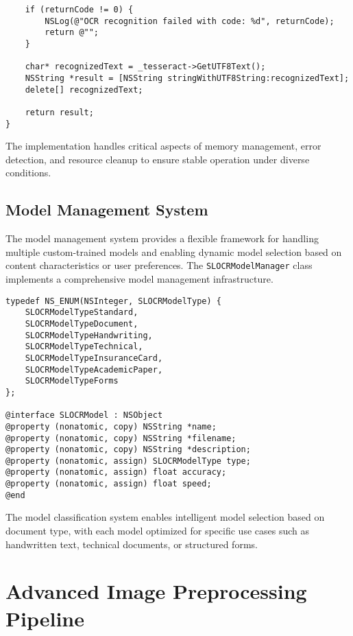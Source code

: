 \begin{table}[H]
\begin{verbatim}
    if (returnCode != 0) {
        NSLog(@"OCR recognition failed with code: %d", returnCode);
        return @"";
    }
    
    char* recognizedText = _tesseract->GetUTF8Text();
    NSString *result = [NSString stringWithUTF8String:recognizedText];
    delete[] recognizedText;
    
    return result;
}
\end{verbatim}

The implementation handles critical aspects of memory management, error detection, and resource cleanup to ensure stable operation under diverse conditions.

\subsection{Model Management System}

The model management system provides a flexible framework for handling multiple custom-trained models and enabling dynamic model selection based on content characteristics or user preferences. The \texttt{SLOCRModelManager} class implements a comprehensive model management infrastructure.

\begin{verbatim}
typedef NS_ENUM(NSInteger, SLOCRModelType) {
    SLOCRModelTypeStandard,
    SLOCRModelTypeDocument,
    SLOCRModelTypeHandwriting,
    SLOCRModelTypeTechnical,
    SLOCRModelTypeInsuranceCard,
    SLOCRModelTypeAcademicPaper,
    SLOCRModelTypeForms
};

@interface SLOCRModel : NSObject
@property (nonatomic, copy) NSString *name;
@property (nonatomic, copy) NSString *filename;
@property (nonatomic, copy) NSString *description;
@property (nonatomic, assign) SLOCRModelType type;
@property (nonatomic, assign) float accuracy;
@property (nonatomic, assign) float speed;
@end
\end{verbatim}

The model classification system enables intelligent model selection based on document type, with each model optimized for specific use cases such as handwritten text, technical documents, or structured forms.


\section{Advanced Image Preprocessing Pipeline}


\end{table}
